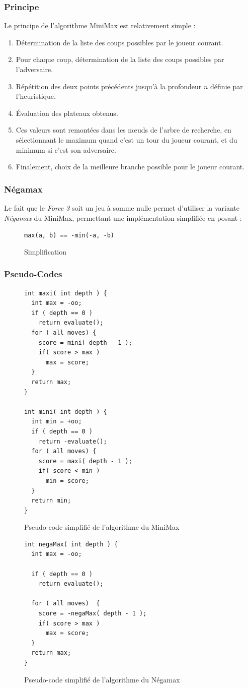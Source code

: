 \documentclass[a4paper,12pt]{article}
\newcommand{\code}[1]{\texttt{#1}}
\begin{document}
\subsubsection{Principe}
Le principe de l'algorithme MiniMax est relativement simple :
\begin{enumerate}
\item Détermination de la liste des coups possibles par le joueur courant.
\item Pour chaque coup, détermination de la liste des coups possibles par l'adversaire.
\item Répétition des deux points précédents jusqu'à la profondeur $n$ définie par l'heuristique.
\item Évaluation des plateaux obtenus.
\item Ces valeurs sont remontées dans les n\oe{}uds de l'arbre de recherche, en sélectionnant le maximum quand c'est un tour du joueur courant, et du minimum si c'est son adversaire.
\item Finalement, choix de la meilleure branche possible pour le joueur courant.
\end{enumerate}

\subsubsection{Négamax}
Le fait que le \emph{Force 3} soit un jeu à somme nulle permet d'utiliser la variante \emph{Négamax} du MiniMax, permettant une implémentation simplifiée en posant :

\begin{figure}[H]
    \code{max(a, b) == -min(-a, -b)}
    \centering
    \caption{Simplification}
\end{figure}
  
\subsubsection{Pseudo-Codes}
\begin{figure}[H]
\centering
\begin{lstlisting}
int maxi( int depth ) {
  int max = -oo;
  if ( depth == 0 )
    return evaluate();
  for ( all moves) {
    score = mini( depth - 1 );
    if( score > max )
      max = score;
  }
  return max;
}
 
int mini( int depth ) {
  int min = +oo;
  if ( depth == 0 )
    return -evaluate();
  for ( all moves) {
    score = maxi( depth - 1 );
    if( score < min )
      min = score;
  }
  return min;
}
\end{lstlisting}
\caption{Pseudo-code simplifié de l'algorithme du MiniMax}
\end{figure}
\begin{figure}[H]
\centering
\begin{lstlisting}
int negaMax( int depth ) {
  int max = -oo;
  
  if ( depth == 0 )
    return evaluate();
    
  for ( all moves)  {
    score = -negaMax( depth - 1 );
    if( score > max )
      max = score;
  }
  return max;
}
\end{lstlisting}
\caption{Pseudo-code simplifié de l'algorithme du Négamax}
\end{figure}
  
\end{document}
